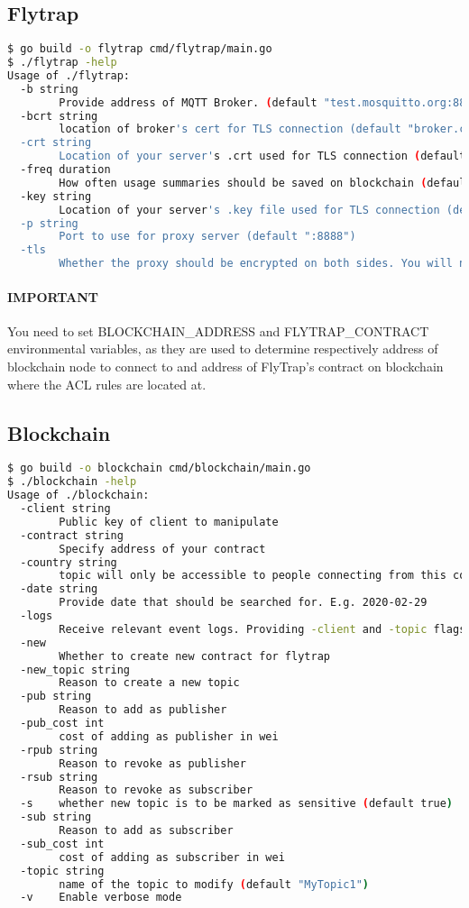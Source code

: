 \subsection{Flytrap}
\begin{lstlisting}[language=bash,breaklines=true]
$ go build -o flytrap cmd/flytrap/main.go
$ ./flytrap -help
Usage of ./flytrap:
  -b string
    	Provide address of MQTT Broker. (default "test.mosquitto.org:8883")
  -bcrt string
    	location of broker's cert for TLS connection (default "broker.crt")
  -crt string
    	Location of your server's .crt used for TLS connection (default "server.crt")
  -freq duration
    	How often usage summaries should be saved on blockchain (default 30s)
  -key string
    	Location of your server's .key file used for TLS connection (default "server.key")
  -p string
    	Port to use for proxy server (default ":8888")
  -tls
    	Whether the proxy should be encrypted on both sides. You will need to provide .crt and .key files if so. (default true)
\end{lstlisting}
\paragraph{IMPORTANT} You need to set BLOCKCHAIN\_ADDRESS and FLYTRAP\_CONTRACT environmental variables, as they are used to determine respectively address of blockchain node to connect to and address of FlyTrap's contract on blockchain where the ACL rules are located at. 
\subsection{Blockchain}
\begin{lstlisting}[language=bash,breaklines=true]
$ go build -o blockchain cmd/blockchain/main.go
$ ./blockchain -help
Usage of ./blockchain:
  -client string
    	Public key of client to manipulate
  -contract string
    	Specify address of your contract
  -country string
    	topic will only be accessible to people connecting from this country. 2 letter ISO code. (default "GB")
  -date string
    	Provide date that should be searched for. E.g. 2020-02-29
  -logs
    	Receive relevant event logs. Providing -client and -topic flags will restrict the search only to relevant fields.
  -new
    	Whether to create new contract for flytrap
  -new_topic string
    	Reason to create a new topic
  -pub string
    	Reason to add as publisher
  -pub_cost int
    	cost of adding as publisher in wei
  -rpub string
    	Reason to revoke as publisher
  -rsub string
    	Reason to revoke as subscriber
  -s	whether new topic is to be marked as sensitive (default true)
  -sub string
    	Reason to add as subscriber
  -sub_cost int
    	cost of adding as subscriber in wei
  -topic string
    	name of the topic to modify (default "MyTopic1")
  -v	Enable verbose mode
\end{lstlisting}
